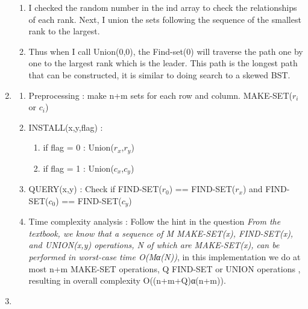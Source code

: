 \documentclass{article}
\begin{document}
\begin{CJK*}{UTF8}{bsmi}
\begin{enumerate}
\begin{enumerate}
    \item I checked the random number in the ind array to check the relationships of each rank. Next, I union the sets following the sequence of the smallest rank to the largest.
    \item Thus when I call Union(0,0), the Find-set(0) will traverse the path one by one to the largest rank which is the leader. This path is the longest path that can be constructed, it is similar to doing search to a skewed BST.
    \end{enumerate}    
    \item \begin{enumerate}
        \item Preprocessing : make n+m sets for each row and column. MAKE-SET($r_i$ or $c_i$)
        \item INSTALL(x,y,flag) : \begin{enumerate}
            \item if flag = 0 : Union($r_x$,$r_y$)
            \item if flag = 1 : Union($c_x$,$c_y$)
        \end{enumerate} 
        \item QUERY(x,y) : Check if FIND-SET($r_0$) == FIND-SET($r_x$) and FIND-SET($c_0$) == FIND-SET($c_y$)
        \item Time complexity analysis : Follow the hint in the question \textit{From the textbook, we know that a sequence of M MAKE-SET(x), FIND-SET(x), and UNION(x,y) operations, N of which are MAKE-SET(x), can be performed in worst-case time O(Mα(N))}, in this implementation we do at most n+m MAKE-SET operations, Q FIND-SET or UNION operations , resulting in overall complexity O((n+m+Q)α(n+m)).
    \end{enumerate}

    \item 
    


\end{enumerate}
\end{CJK*}
\end{document}
